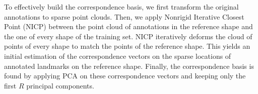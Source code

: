 To effectively build the correspondence basis, we first transform the original annotations to sparse point clouds. Then, we apply Nonrigid Iterative Closest Point (NICP) \cite{Amber2007} between the point cloud of annotations in the reference shape and the one of every shape of the training set. NICP iteratively deforms the cloud of points of every shape to match the points of the reference shape. This yields an initial estimation of the correspondence vectors on the sparse locations of annotated landmarks on the reference shape. Finally, the correspondence basis is found by applying PCA on these correspondence vectors and keeping only the first $R$ principal components.




